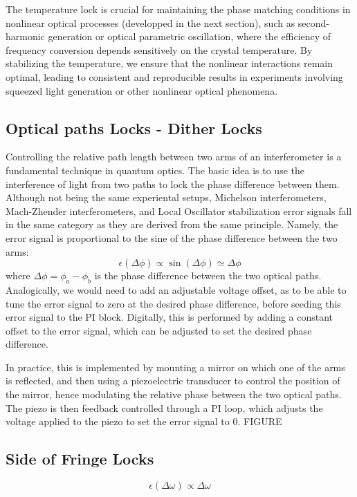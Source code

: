 The temperature lock is crucial for maintaining the phase matching conditions in nonlinear optical processes (developped in the next section), such as second-harmonic generation or optical parametric oscillation, where the efficiency of frequency conversion depends sensitively on the crystal temperature. By stabilizing the temperature, we ensure that the nonlinear interactions remain optimal, leading to consistent and reproducible results in experiments involving squeezed light generation or other nonlinear optical phenomena. \newline



\subsection{Optical paths Locks - Dither Locks }
Controlling the relative path length between two arms of an interferometer is a fundamental technique in quantum optics. The basic idea is to use the interference of light from two paths to lock the phase difference between them. Although not being the same experiental setups, Michelson interferometers, Mach-Zhender interferometers, and Local Oscillator stabilization error signals fall in the same category as they are derived from the same principle. Namely, the error signal is proportional to the sine of the phase difference between the two arms: 
\begin{equation}
\epsilon(\Delta\phi) \propto \sin(\Delta\phi) \simeq \Delta\phi 
\end{equation}
where $\Delta \phi = \phi_a - \phi_b$ is the phase difference between the two optical paths. Analogically, we would need to add an adjustable voltage offset, as to be able to tune the error signal to zero at the desired phase difference, before seeding this error signal to the PI block. Digitally, this is performed by adding a constant offset to the error signal, which can be adjusted to set the desired phase difference. \newline

\noindent In practice, this is implemented by mounting a mirror on which one of the arms is reflected, and then using a piezoelectric transducer to control the position of the mirror, hence modulating the relative phase between the two optical paths. The piezo is then feedback controlled through a PI loop, which adjusts the voltage applied to the piezo to set the error signal to 0. 
FIGURE 

\subsection{Side of Fringe Locks}
\begin{equation}
\epsilon(\Delta \omega) \propto \Delta \omega
\end{equation}

